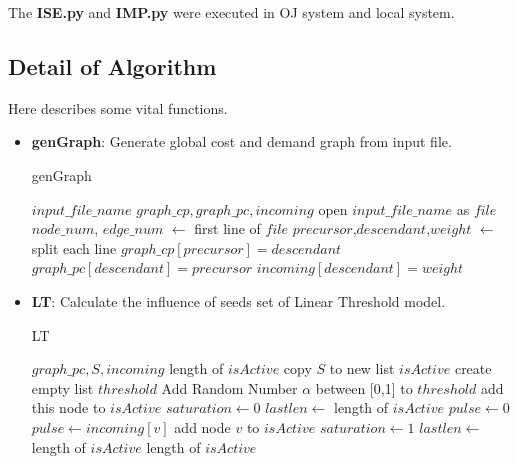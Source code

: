 \documentclass[conference,compsoc]{IEEEtran}
\renewcommand{\algorithmicrequire}{\textbf{Input:}}
\renewcommand{\algorithmicensure}{\textbf{Output:}}
\begin{document}
The \textbf{ISE.py} and \textbf{IMP.py} were executed in OJ system and local
system.

\subsection{Detail of Algorithm}
Here describes some vital functions.
\begin{itemize}
    \item \textbf{genGraph}: Generate global cost and demand graph from
    input file.
    \begin{algorithm}[H]
     \caption{genGraph}
     \begin{algorithmic}[1]
     \renewcommand{\algorithmicrequire}{\textbf{Input:}}
     \renewcommand{\algorithmicensure}{\textbf{Output:}}
     \REQUIRE $input\_file\_name$
     \ENSURE $graph\_cp, graph\_pc, incoming$
     \STATE open $input\_file\_name$ as $file$ 
     \STATE $node\_num$, $edge\_num$ $\leftarrow$ first line of $file$
     \STATE {}
       \STATE $precursor$,$descendant$,$weight$ $\leftarrow$ split each line
          \STATE $graph\_cp[precursor] = descendant$
	  \STATE $graph\_pc[descendant] = precursor$
	  \STATE $incoming[descendant] = weight$
     \ENDFOR
     \end{algorithmic}
   \end{algorithm}

   \item \textbf{LT}: Calculate the influence of seeds set of Linear Threshold
	   model.
     \begin{algorithm}[H]
     \caption{LT}
     \begin{algorithmic}[2]
     \renewcommand{\algorithmicrequire}{\textbf{Input:}}
     \renewcommand{\algorithmicensure}{\textbf{Output:}}
     \REQUIRE $graph\_pc, S, incoming$
     \ENSURE  length of $isActive$
     \STATE copy $S$ to new list $isActive$
     \STATE create empty list $threshold$
	\STATE Add Random Number $\alpha$ between [0,1] to $threshold$
	     \STATE add this node to $isActive$
	\ENDIF
     \ENDFOR
     \STATE $saturation \leftarrow 0$ 
     \STATE $lastlen \leftarrow $ length of $isActive$ 
	\STATE $pulse \leftarrow 0$
	     \STATE $pulse \leftarrow incoming[v]$
        \ENDFOR
            \STATE add node $v$ to $isActive$
	\ENDIF
	     \STATE $saturation \leftarrow 1$ 
	\ENDIF
	\STATE $lastlen \leftarrow$ length of $isActive$
     \ENDWHILE
     \RETURN length of $isActive$
     \end{algorithmic}
     \end{algorithm}


\end{itemize}
\end{document}
